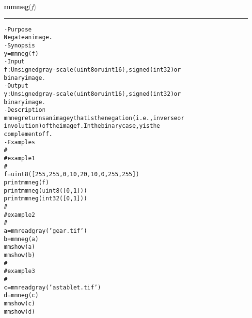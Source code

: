     \label{multireg:num_pymorph:mmneg}
    \vspace{0.5ex}

    \begin{boxedminipage}{\textwidth}

    \raggedright \textbf{mmneg}(\textit{f})

    \vspace{-1.5ex}

    \rule{\textwidth}{0.5\fboxrule}
\begin{alltt}
- Purpose
    Negate an image.
- Synopsis
    y = mmneg(f)
- Input
    f: Unsigned gray-scale (uint8 or uint16), signed (int32) or
       binary image.
- Output
    y: Unsigned gray-scale (uint8 or uint16), signed (int32) or
       binary image.
- Description
    mmneg returns an image y that is the negation (i.e., inverse or
    involution) of the image f . In the binary case, y is the
    complement of f .
- Examples
    \#
    \#   example 1
    \#
    f=uint8([255, 255, 0, 10, 20, 10, 0, 255, 255])
    print mmneg(f)
    print mmneg(uint8([0, 1]))
    print mmneg(int32([0, 1]))
    \#
    \#   example 2
    \#
    a = mmreadgray('gear.tif')
    b = mmneg(a)
    mmshow(a)
    mmshow(b)
    \#
    \#   example 3
    \#
    c = mmreadgray('astablet.tif')
    d = mmneg(c)
    mmshow(c)
    mmshow(d)\end{alltt}

    \vspace{1ex}

    \end{boxedminipage}

    \label{multireg:num_pymorph:mmopen}
    \vspace{0.5ex}

